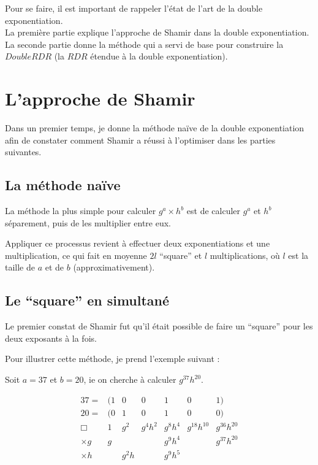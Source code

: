 \documentclass[12pt, a4paper]{memoir}
\begin{document}
Pour se faire, il est important de rappeler l'état de l'art de la double exponentiation. \\
La première partie explique l'approche de Shamir dans la double exponentiation. \\
La seconde partie donne la méthode qui a servi de base pour construire la $DoubleRDR$ 
(la $RDR$ étendue à la double exponentiation).

\section{L'approche de Shamir}

Dans un premier temps, je donne la méthode naïve de la double exponentiation afin de constater comment Shamir
a réussi à l'optimiser dans les parties suivantes.

\subsection{La méthode naïve}

La méthode la plus simple pour calculer $g^a \times h^b$ est de calculer $g^a$ et $h^b$ séparement, puis de les multiplier
entre eux.

Appliquer ce processus revient à effectuer deux exponentiations et une multiplication, ce qui fait en moyenne
$2l$ ``square'' et $l$ multiplications, où $l$ est la taille de $a$ et de $b$ (approximativement).

\subsection{Le ``square'' en simultané}

Le premier constat de Shamir fut qu'il était possible de faire un ``square'' pour les deux exposants à la fois.

Pour illustrer cette méthode, je prend l'exemple suivant :

Soit $a=37$ et $b=20$, ie on cherche à calculer $g^{37} h^{20}$.

  $$\begin{array}{cccccccc}
  37 = & (1 & 0 & 0 & 1 & 0 & 1) \\
  20 = & (0 & 1 & 0 & 1 & 0 & 0) \\
  \Box       & 1  & g^2   & g^4 h^2 & g^8 h^4 & g^{18} h^{10} & g^{36} h^{20} \\
  \times g & g  & \,    & \,      & g^9 h^4 & \,            & g^{37} h^{20} \\
  \times h & \, & g^2 h & \,      & g^9 h^5 & \,            & \,
 \end{array}$$ 
 
\end{document}
